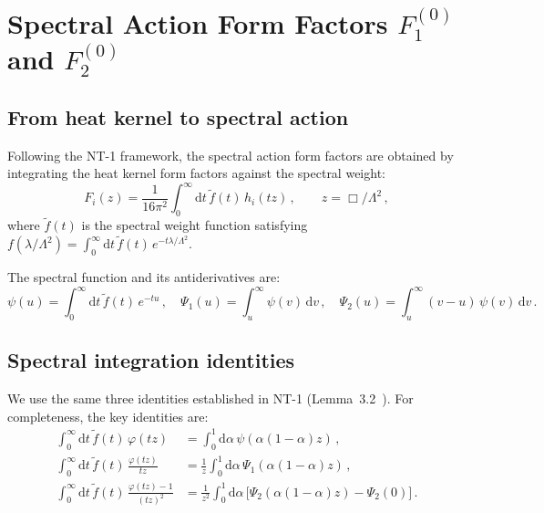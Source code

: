 \documentclass[11pt,a4paper]{article}
\newcommand{\dd}{\mathrm{d}}
\theoremstyle{definition}
\theoremstyle{remark}
\begin{document}
\section{Spectral Action Form Factors $F_1^{(0)}$ and $F_2^{(0)}$}
\label{sec:spectral}

\subsection{From heat kernel to spectral action}

Following the NT-1 framework, the spectral action form factors are
obtained by integrating the heat kernel form factors against the
spectral weight:
\begin{equation}
  F_i(z) = \frac{1}{16\pi^2}
  \int_0^\infty \dd t\,\tilde{f}(t)\,h_i(tz)\,,
  \qquad z = \Box/\Lambda^2\,,
  \label{eq:Fi-def}
\end{equation}
where $\tilde{f}(t)$ is the spectral weight function satisfying
$f(\lambda/\Lambda^2) = \int_0^\infty \dd t\,\tilde{f}(t)\,e^{-t\lambda/\Lambda^2}$.

The spectral function and its antiderivatives are:
\begin{equation}
  \psi(u) = \int_0^\infty \dd t\,\tilde{f}(t)\,e^{-tu}\,,\quad
  \Psi_1(u) = \int_u^\infty \psi(v)\,\dd v\,,\quad
  \Psi_2(u) = \int_u^\infty (v-u)\,\psi(v)\,\dd v\,.
  \label{eq:psi-defs}
\end{equation}


\subsection{Spectral integration identities}

We use the same three identities established in NT-1
(Lemma~3.2~\cite{NT1}).  For completeness, the key identities are:
\begin{align}
  \int_0^\infty \dd t\,\tilde{f}(t)\,\varphi(tz)
  &= \int_0^1 \dd\alpha\,\psi(\alpha(1-\alpha)z)\,,
  \label{eq:int-phi}\\[4pt]
  \int_0^\infty \dd t\,\tilde{f}(t)\,\frac{\varphi(tz)}{tz}
  &= \frac{1}{z}\int_0^1 \dd\alpha\,\Psi_1(\alpha(1-\alpha)z)\,,
  \label{eq:int-phi-over-x}\\[4pt]
  \int_0^\infty \dd t\,\tilde{f}(t)\,\frac{\varphi(tz)-1}{(tz)^2}
  &= \frac{1}{z^2}\int_0^1 \dd\alpha\,\bigl[
  \Psi_2(\alpha(1-\alpha)z) - \Psi_2(0)\bigr]\,.
  \label{eq:int-phim1-over-x2}
\end{align}
\end{document}
